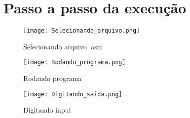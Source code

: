 \documentclass[a4paper, 12 pt]{article}
\begin{document}
    \newpage
    \section{Passo a passo da execução}

    \begin{figure}[ht]
    \centering
    \texttt{[image: Selecionando\_arquivo.png]}
    \caption{Selecionando arquivo .asm}
    \end{figure}

    \begin{figure}[ht]
    \centering
    \texttt{[image: Rodando\_programa.png]}
    \caption{Rodando programa}
    \end{figure}    

    \begin{figure}[ht]
    \centering
    \texttt{[image: Digitando\_saida.png]}
    \caption{Digitando input}
    \end{figure}
\end{document}

